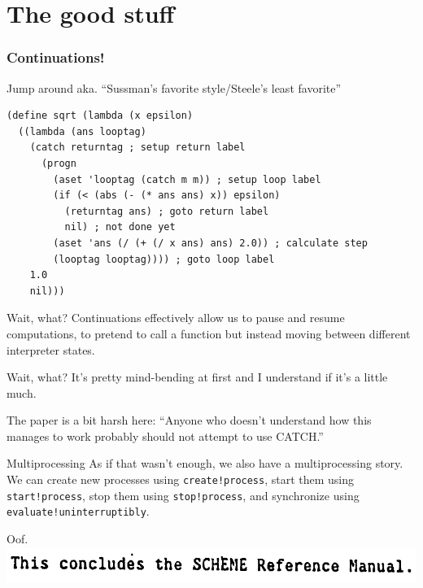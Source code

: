 \documentclass[aspectratio=169]{beamer}
\begin{document}
  \section{The good stuff}
  \begin{frame}[fragile]
    \frametitle{Continuations!}
    \begin{listing}[H]
      \caption{Jump around aka. “Sussman’s favorite style/Steele’s least favorite”}
      \begin{verbatim}
(define sqrt (lambda (x epsilon)
  ((lambda (ans looptag)
    (catch returntag ; setup return label
      (progn
        (aset 'looptag (catch m m)) ; setup loop label
        (if (< (abs (- (* ans ans) x)) epsilon)
          (returntag ans) ; goto return label
          nil) ; not done yet
        (aset 'ans (/ (+ (/ x ans) ans) 2.0)) ; calculate step
        (looptag looptag)))) ; goto loop label
    1.0
    nil)))
      \end{verbatim}
    \end{listing}
  \end{frame}
  \begin{frame}{Wait, what?}
    Continuations effectively allow us to pause and resume computations, to
    pretend to call a function but instead moving between different interpreter
    states.
  \end{frame}
  \begin{frame}{Wait, what?}
    It’s pretty mind-bending at first and I understand if it’s a little much.

    \bigskip

    \small The paper is a bit harsh here: “Anyone who doesn’t understand how
    this manages to work probably should not attempt to use CATCH.”
  \end{frame}
  \begin{frame}{Multiprocessing}
    As if that wasn’t enough, we also have a multiprocessing story. We can
    create new processes using \texttt{create!process}, start them using
    \texttt{start!process}, stop them using \texttt{stop!process}, and
    synchronize using \texttt{evaluate!uninterruptibly}.
  \end{frame}
  \begin{frame}{Oof.}
    \includegraphics[width=14cm]{reference_end.png}
  \end{frame}
\end{document}
